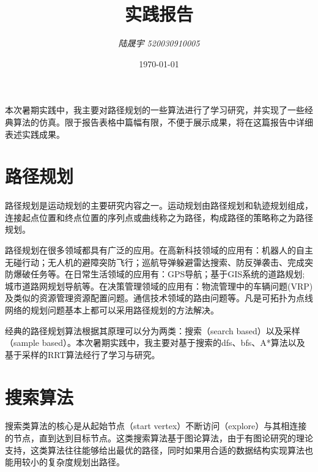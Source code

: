\documentclass[12pt]{article}
\title{实践报告}
\author{\emph{陆晟宇 520030910005}}
\date{\today}
\begin{document}
    \maketitle
    本次暑期实践中，我主要对路径规划的一些算法进行了学习研究，并实现了一些经典算法的仿真。限于报告表格中篇幅有限，不便于展示成果，将在这篇报告中详细表述实践成果。

    \section{路径规划}
    路径规划是运动规划的主要研究内容之一。运动规划由路径规划和轨迹规划组成，连接起点位置和终点位置的序列点或曲线称之为路径，构成路径的策略称之为路径规划。

    路径规划在很多领域都具有广泛的应用。在高新科技领域的应用有：机器人的自主无碰行动；无人机的避障突防飞行；巡航导弹躲避雷达搜索、防反弹袭击、完成突防爆破任务等。在日常生活领域的应用有：GPS导航；基于GIS系统的道路规划;城市道路网规划导航等。在决策管理领域的应用有：物流管理中的车辆问题(VRP)及类似的资源管理资源配置问题。通信技术领域的路由问题等。凡是可拓扑为点线网络的规划问题基本上都可以采用路径规划的方法解决。

    经典的路径规划算法根据其原理可以分为两类：搜索（search based）以及采样（sample based）。本次暑期实践中，我主要对基于搜索的dfs、bfs、A*算法以及基于采样的RRT算法经行了学习与研究。

    \section{搜索算法} 
    搜索类算法的核心是从起始节点（start vertex）不断访问（explore）与其相连接的节点，直到达到目标节点。这类搜索算法基于图论算法，由于有图论研究的理论支持，这类算法往往能够给出最优的路径，同时如果用合适的数据结构实现算法也能用较小的复杂度规划出路径。
\end{document}
